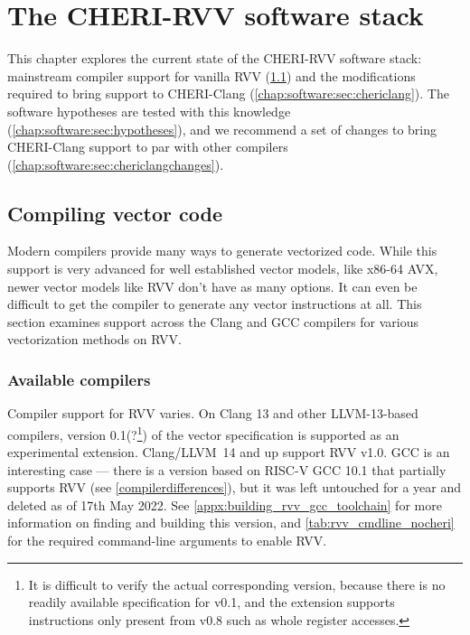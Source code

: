 \documentclass[../thesis]{subfiles}
\begin{document}
\chapter{The CHERI-RVV software stack\label{chap:software}}
This chapter explores the current state of the CHERI-RVV software stack: mainstream compiler support for vanilla RVV (\cref{chap:software:sec:compilersupport}) and the modifications required to bring support to CHERI-Clang (\cref{chap:software:sec:chericlang}).
The software hypotheses are tested with this knowledge (\cref{chap:software:sec:hypotheses}), and we recommend a set of changes to bring CHERI-Clang support to par with other compilers (\cref{chap:software:sec:chericlangchanges}).

\section{Compiling vector code}\label{chap:software:sec:compilersupport}
Modern compilers provide many ways to generate vectorized code.
While this support is very advanced for well established vector models, like x86-64 AVX, newer vector models like RVV don't have as many options.
It can even be difficult to get the compiler to generate any vector instructions at all.
This section examines support across the Clang and GCC compilers for various vectorization methods on RVV.

\subsection{Available compilers}
Compiler support for RVV varies.
On Clang 13 and other LLVM-13-based compilers, version 0.1(?\footnote{It is difficult to verify the actual corresponding version, because there is no readily available specification for v0.1, and the extension supports instructions only present from v0.8 such as whole register accesses.}) of the vector specification is supported as an experimental extension.
Clang/LLVM~14 and up support RVV v1.0.
GCC is an interesting case --- there is a version based on RISC-V GCC 10.1 that partially supports RVV (see \cref{compilerdifferences}), but it was left untouched for a year and deleted as of 17th May 2022.
See \cref{appx:building_rvv_gcc_toolchain} for more information on finding and building this version, and \cref{tab:rvv_cmdline_nocheri} for the required command-line arguments to enable RVV.
\end{document}
